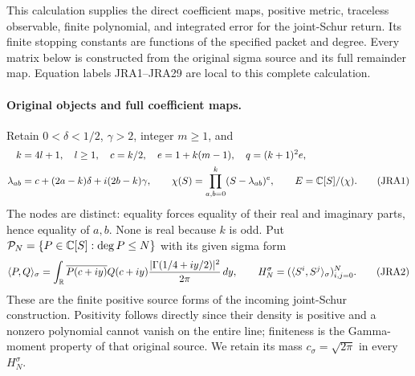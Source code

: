 This calculation supplies the direct coefficient maps, positive metric,
traceless observable, finite polynomial, and integrated error for the
joint-Schur return. Its finite stopping constants are functions of the
specified packet and degree. Every matrix below is constructed from the
original sigma source and its full remainder map. Equation labels JRA1--JRA29
are local to this complete calculation.

\paragraph{Original objects and full coefficient maps.}
Retain $0<\delta<1/2$, $\gamma>2$, integer $m\geq1$, and
\begin{align}
 k&=4l+1,\quad l\geq1,\quad c=k/2,\quad e=1+k(m-1),\quad q=(k+1)^2e,\notag\\
 \lambda_{ab}&=c+(2a-k)\delta+i(2b-k)\gamma,\qquad
 \chi(S)=\prod_{a,b=0}^k(S-\lambda_{ab})^e,\qquad
 E=\mathbb C[S]/(\chi).\tag{JRA1}
\end{align}
The nodes are distinct: equality forces equality of their real and imaginary
parts, hence equality of $a,b$. None is real because $k$ is odd.
Put $\mathcal P_N=\{P\in\mathbb C[S]:\deg P\leq N\}$ with its given sigma form
\begin{equation}
 \langle P,Q\rangle_\sigma=\int_\mathbb R
 \overline{P(c+iy)}Q(c+iy)
 \frac{|\Gamma(1/4+iy/2)|^2}{2\pi}\,dy,
 \qquad H_N^\sigma=(\langle S^i,S^j\rangle_\sigma)_{i,j=0}^N.
 \tag{JRA2}
\end{equation}
These are the finite positive source forms of the incoming joint-Schur
construction. Positivity follows directly since their density is positive
and a nonzero polynomial cannot vanish on the entire line; finiteness is
the Gamma-moment property of that original source. We retain its mass
$c_\sigma=\sqrt{2\pi}$ in every $H_N^\sigma$.

